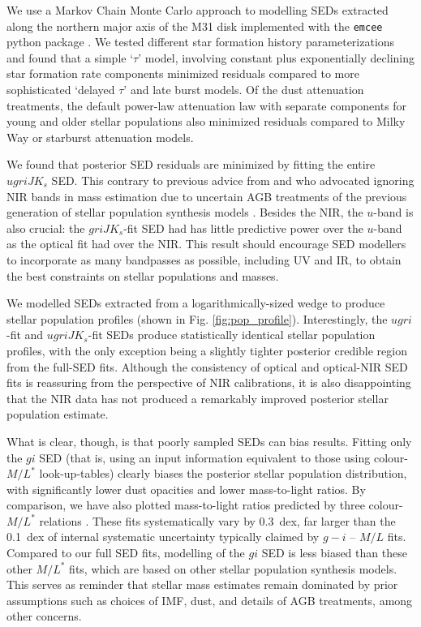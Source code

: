 \documentclass{iau}
\begin{document}
We use a Markov Chain Monte Carlo approach to modelling SEDs extracted along the northern major axis of the M31 disk implemented with the \texttt{emcee} python package \citep{Foreman-Mackey:2013}.
We tested different star formation history parameterizations and found that a simple `$\tau$' model, involving constant plus exponentially declining star formation rate components minimized residuals compared to more sophisticated `delayed $\tau$' and late burst models.
Of the dust attenuation treatments, the default power-law attenuation law with separate components for young and older stellar populations also minimized residuals compared to Milky Way or starburst attenuation models.

We found that posterior SED residuals are minimized by fitting the entire $ugriJK_s$ SED.
This contrary to previous advice from \cite{Taylor:2011} and \cite{Zibetti:2009} who advocated ignoring NIR bands in mass estimation due to uncertain AGB treatments of the previous generation of stellar population synthesis models \citep[e.g.][]{Bruzual:2003,Maraston:2005}.
Besides the NIR, the $u$-band is also crucial: the $griJK_s$-fit SED had has little predictive power over the $u$-band as the optical fit had over the NIR.
This result should encourage SED modellers to incorporate as many bandpasses as possible, including UV and IR, to obtain the best constraints on stellar populations and masses.

We modelled SEDs extracted from a logarithmically-sized wedge \citep[e.g.][their Fig. 2]{Courteau:2011} to produce stellar population profiles (shown in Fig. \ref{fig:pop_profile}).
Interestingly, the $ugri$-fit and $ugriJK_s$-fit SEDs produce statistically identical stellar population profiles, with the only exception being a slightly tighter posterior credible region from the full-SED fits.
Although the consistency of optical and optical-NIR SED fits is reassuring from the perspective of NIR calibrations, it is also disappointing that the NIR data has not produced a remarkably improved posterior stellar population estimate.

What is clear, though, is that poorly sampled SEDs can bias results.
Fitting only the $gi$ SED (that is, using an input information equivalent to those using colour-$M/L^*$ look-up-tables) clearly biases the posterior stellar population distribution, with significantly lower dust opacities and lower mass-to-light ratios. 
By comparison, we have also plotted mass-to-light ratios predicted by three colour-$M/L^*$ relations \citep{Zibetti:2009,Taylor:2011,Into:2013}.
These fits systematically vary by 0.3~dex, far larger than the 0.1~dex of internal systematic uncertainty typically claimed by $g-i$ -- $M/L$ fits. 
Compared to our full SED fits, modelling of the $gi$ SED is less biased than these other $M/L^*$ fits, which are based on other stellar population synthesis models.
This serves as reminder that stellar mass estimates remain dominated by prior assumptions such as choices of IMF, dust, and details of AGB treatments, among other concerns.
\end{document}
